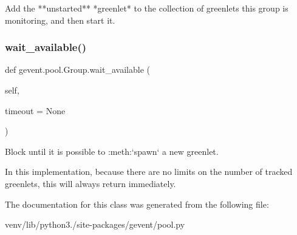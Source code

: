 \begin{DoxyVerb}Add the **unstarted** *greenlet* to the collection of greenlets
this group is monitoring, and then start it.
\end{DoxyVerb}
 \mbox{\label{classgevent_1_1pool_1_1_group_af9ad7f7c08e17a7b40aaa7dab049466a}} 
\subsubsection{\texorpdfstring{wait\+\_\+available()}{wait\_available()}}
{\footnotesize\ttfamily def gevent.\+pool.\+Group.\+wait\+\_\+available (\begin{DoxyParamCaption}\item[{}]{self,  }\item[{}]{timeout = {\ttfamily None} }\end{DoxyParamCaption})}

\begin{DoxyVerb}Block until it is possible to :meth:`spawn` a new greenlet.

In this implementation, because there are no limits on the number
of tracked greenlets, this will always return immediately.
\end{DoxyVerb}
 

The documentation for this class was generated from the following file\+:\begin{DoxyCompactItemize}
\item 
venv/lib/python3./site-\/packages/gevent/pool.\+py\end{DoxyCompactItemize}
